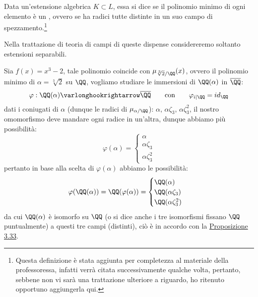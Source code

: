 \documentclass[11pt]{scrartcl}
\begin{document}
\begin{definition}
    Data un'estensione algebrica $K \subset L$, essa si dice  se il polinomio minimo di ogni elemento è un
    , ovvero se ha radici tutte distinte in un suo campo di spezzamento.\footnote{Questa definizione
    è stata aggiunta per completezza al materiale della professoressa, infatti verrà citata successivamente qualche volta, pertanto, sebbene non vi sarà una trattazione ulteriore 
    a riguardo, ho ritenuto opportuno aggiungerla qui.}
\end{definition}

Nella trattazione di teoria di campi di queste dispense considereremo soltanto estensioni separabili.

\begin{example}
    Sia $f(x) = x^3 - 2$, tale polinomio coincide con $\mu_{\sqrt[3]{2}/\QQ}(x)$, ovvero il polinomio minimo di $\alpha = \sqrt[3]{2}$ su $\QQ$, vogliamo studiare le immersioni di $\QQ(\alpha)$ in $\overline \QQ$:
    \[ \varphi : \QQ(\alpha) \varlonghookrightarrow \overline \QQ \qquad \text{con} \qquad \varphi_{i|\QQ} = id_\QQ
        \]
    dati i coniugati di $\alpha$ (dunque le radici di $\mu_{\alpha/\QQ}$): $\alpha$, $\alpha\zeta_3$, $\alpha\zeta_3^2$, il nostro omomorfismo deve mandare ogni radice in un'altra, dunque abbiamo più possibilità:
    \[ \varphi(\alpha) = \begin{cases}
        \alpha \\
        \alpha\zeta_3 \\
         \alpha\zeta_3^2
        \end{cases}
        \]
    pertanto in base alla scelta di $\varphi(\alpha)$ abbiamo le possibilità:
    \[ \varphi(\QQ(\alpha)) = \QQ(\varphi(\alpha)) = \begin{cases}
        \QQ(\alpha)\\
        \QQ(\alpha\zeta_3)\\
        \QQ(\alpha\zeta_3^2)\\
    \end{cases}
        \]
    da cui $\QQ(\alpha)$ è isomorfo su $\QQ$ (o si dice anche i tre isomorfismi fissano $\QQ$ puntualmente) a questi tre campi (distinti), ciò è in accordo con la \hyperref[3.33]{Proposizione 3.33}.
\end{example}
\end{document}
